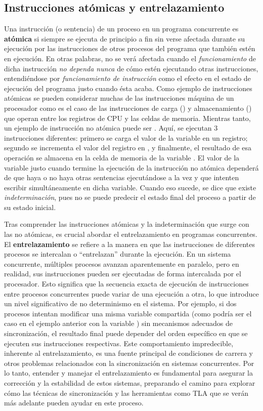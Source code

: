 \subsection{Instrucciones atómicas y entrelazamiento}\label{subsec:concurrentatomic}
Una instrucción (o sentencia) de un proceso en un programa concurrente es \textbf{atómica} si siempre se ejecuta de principio a fin sin verse afectada durante su ejecución por las instrucciones de otros procesos del programa que también estén en ejecución. En otras palabras, no se verá afectada cuando el \textit{funcionamiento} de dicha instrucción \textit{no dependa nunca} de cómo estén ejecutando otras instrucciones, entendiéndose por \textit{funcionamiento de instrucción} como el efecto en el estado de ejecución del programa justo cuando ésta acaba. Como ejemplo de instrucciones atómicas se pueden considerar muchas de las instrucciones máquina de un procesador como es el caso de las instrucciones de carga () y almacenamiento () que operan entre los registros de CPU y las celdas de memoria. Mientras tanto, un ejemplo de instrucción no atómica puede ser . Aquí, se ejecutan 3 instrucciones diferentes: primero se carga el valor de la variable  en un registro; segundo se incrementa el valor del registro en , y finalmente, el resultado de esa operación se almacena en la celda de memoria de la variable . El valor de la variable  justo cuando termine la ejecución de la instrucción no atómica dependerá de que haya o no haya otras sentencias ejecutándose a la vez y que intenten escribir simultáneamente en dicha variable. Cuando eso sucede, se dice que existe \textit{indeterminación}, pues no se puede predecir el estado final del proceso a partir de su estado inicial.

Tras comprender las instrucciones atómicas y la indeterminación que surge con las no atómicas, es crucial abordar el entrelazamiento en programas concurrentes. El \textbf{entrelazamiento} se refiere a la manera en que las instrucciones de diferentes procesos se intercalan o ``entrelazan'' durante la ejecución. En un sistema concurrente, múltiples procesos avanzan aparentemente en paralelo, pero en realidad, sus instrucciones pueden ser ejecutadas de forma intercalada por el procesador. Esto significa que la secuencia exacta de ejecución de instrucciones entre procesos concurrentes puede variar de una ejecución a otra, lo que introduce un nivel significativo de no determinismo en el sistema. Por ejemplo, si dos procesos intentan modificar una misma variable compartida (como podría ser el caso en el ejemplo anterior con la variable ) sin mecanismos adecuados de sincronización, el resultado final puede depender del orden específico en que se ejecuten sus instrucciones respectivas. Este comportamiento impredecible, inherente al entrelazamiento, es una fuente principal de condiciones de carrera y otros problemas relacionados con la sincronización en sistemas concurrentes. Por lo tanto, entender y manejar el entrelazamiento es fundamental para asegurar la corrección y la estabilidad de estos sistemas, preparando el camino para explorar cómo las técnicas de sincronización y las herramientas como TLA que se verán más adelante pueden ayudar en este proceso.

